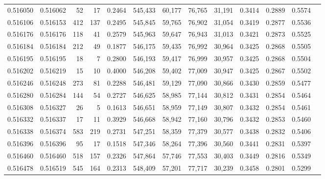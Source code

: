 \begin{tabular}{rrrrrrrrrrrrr}
0.516050 & 0.516062 &    52 &    17 &                                     0.2464 & 545,433 &  60,177 &  76,765 &  31,191 & 0.3414 & 0.2889 & 0.5574 \\
0.516106 & 0.516153 &   412 &   137 &                                     0.2495 & 545,845 &  59,765 &  76,902 &  31,054 & 0.3419 & 0.2877 & 0.5536 \\
0.516176 & 0.516176 &   118 &    41 &                                     0.2579 & 545,963 &  59,647 &  76,943 &  31,013 & 0.3421 & 0.2873 & 0.5525 \\
0.516184 & 0.516184 &   212 &    49 &                                     0.1877 & 546,175 &  59,435 &  76,992 &  30,964 & 0.3425 & 0.2868 & 0.5505 \\
0.516195 & 0.516195 &    18 &     7 &                                     0.2800 & 546,193 &  59,417 &  76,999 &  30,957 & 0.3425 & 0.2868 & 0.5504 \\
0.516202 & 0.516219 &    15 &    10 &                                     0.4000 & 546,208 &  59,402 &  77,009 &  30,947 & 0.3425 & 0.2867 & 0.5502 \\
0.516246 & 0.516248 &   273 &    81 &                                     0.2288 & 546,481 &  59,129 &  77,090 &  30,866 & 0.3430 & 0.2859 & 0.5477 \\
0.516280 & 0.516284 &   144 &    54 &                                     0.2727 & 546,625 &  58,985 &  77,144 &  30,812 & 0.3431 & 0.2854 & 0.5464 \\
0.516308 & 0.516327 &    26 &     5 &                                     0.1613 & 546,651 &  58,959 &  77,149 &  30,807 & 0.3432 & 0.2854 & 0.5461 \\
0.516332 & 0.516337 &    17 &    11 &                                     0.3929 & 546,668 &  58,942 &  77,160 &  30,796 & 0.3432 & 0.2853 & 0.5460 \\
0.516338 & 0.516374 &   583 &   219 &                                     0.2731 & 547,251 &  58,359 &  77,379 &  30,577 & 0.3438 & 0.2832 & 0.5406 \\
0.516396 & 0.516396 &    95 &    17 &                                     0.1518 & 547,346 &  58,264 &  77,396 &  30,560 & 0.3441 & 0.2831 & 0.5397 \\
0.516460 & 0.516460 &   518 &   157 &                                     0.2326 & 547,864 &  57,746 &  77,553 &  30,403 & 0.3449 & 0.2816 & 0.5349 \\
0.516478 & 0.516519 &   545 &   164 &                                     0.2313 & 548,409 &  57,201 &  77,717 &  30,239 & 0.3458 & 0.2801 & 0.5299 \\

\end{tabular}
